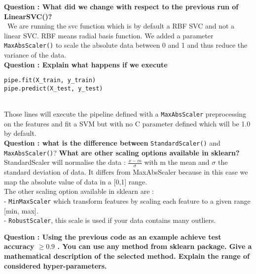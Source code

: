\textbf{Question : What did we change with respect to the previous run of LinearSVC()?} \\

 We are running the svc function which is by default a RBF SVC and not a linear SVC. RBF means radial basis function. We added a parameter \verb|MaxAbsScaler()| to scale the absolute data between 0 and 1 and thus reduce the variance of the data. \\

\textbf{Question : Explain what happens if we execute} 
\begin{verbatim}pipe.fit(X_train, y_train)
pipe.predict(X_test, y_test)\end{verbatim} \\
Those lines will execute the pipeline defined with a \verb|MaxAbsScaler|  preprocessing on the features and fit a SVM but with no C parameter defined which will be 1.0 by default.\\

\textbf{Question : what is the difference between} \verb|StandardScaler()| and \verb|MaxAbsScaler()|? \textbf{What are other scaling options available in sklearn? }\\

StandardScaler will normalise the data : $\frac{x-m}{\sigma}$ with m the mean and $\sigma$ the standard deviation of data. It differs from MaxAbsScaler  because in this case we map the absolute value of data in a [0,1] range.\\	
The other scaling option available in sklearn are : \\
- \verb|MinMaxScaler| which transform features by scaling each feature to a given range [min, max]. \\
- \verb|RobustScaler|, this scale is used if your data contains many outliers. \\ 

\textbf{Question : Using the previous code as an example achieve test accuracy  $\geq0.9$ . You can use any method from sklearn package. Give a mathematical description of the selected method. Explain the range of considered hyper-parameters.}\\

